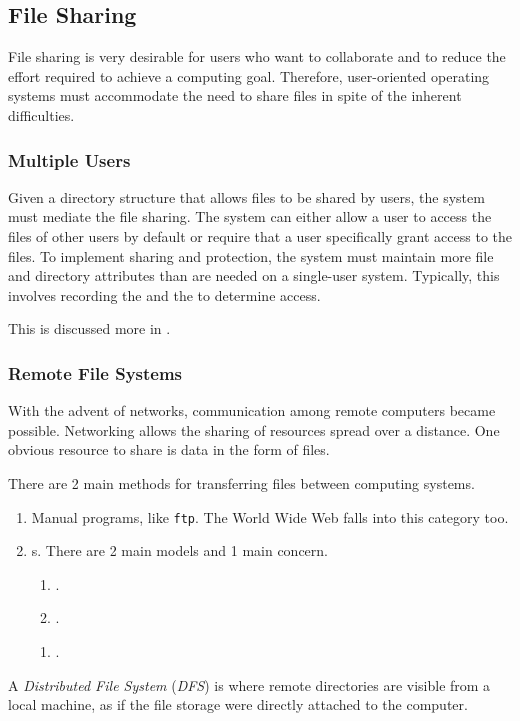 \subsection{File Sharing}\label{subsec:File_Sharing}
File sharing is very desirable for users who want to collaborate and to reduce the effort required to achieve a computing goal.
Therefore, user-oriented operating systems must accommodate the need to share files in spite of the inherent difficulties.

\subsubsection{Multiple Users}\label{subsubsec:File_Sharing-Multiple_Users}
Given a directory structure that allows files to be shared by users, the system must mediate the file sharing.
The system can either allow a user to access the files of other users by default or require that a user specifically grant access to the files.
To implement sharing and protection, the system must maintain more file and directory attributes than are needed on a single-user system.
Typically, this involves recording the  and the  to determine access.

This is discussed more in .

\subsubsection{Remote File Systems}\label{subsubsec:Remote_File_Systems}
With the advent of networks, communication among remote computers became possible.
Networking allows the sharing of resources spread over a distance.
One obvious resource to share is data in the form of files.

There are 2 main methods for transferring files between computing systems.
\begin{enumerate}[noitemsep]
\item Manual programs, like \texttt{ftp}. The World Wide Web falls into this category too.
\item {}s. There are 2 main models and 1 main concern.
  \begin{enumerate}[noitemsep]
  \item {}.
  \item {}.
  \end{enumerate}
  \begin{enumerate}[noitemsep]
  \item {}.
  \end{enumerate}
\end{enumerate}

\begin{definition}\label{def:Distributed_File_System}
  A \emph{Distributed File System} (\emph{DFS}) is where remote directories are visible from a local machine, as if the file storage were directly attached to the computer.
\end{definition}


